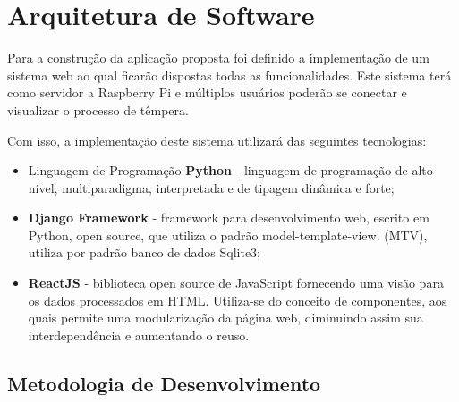 \section{Arquitetura de Software}

Para a construção da aplicação proposta foi definido a implementação de um sistema web ao qual ficarão dispostas todas as funcionalidades. Este sistema terá como servidor a Raspberry Pi e múltiplos usuários poderão se conectar e visualizar o processo de têmpera.

Com isso, a implementação deste sistema utilizará das seguintes tecnologias:
\begin{itemize}
	\item Linguagem de Programação \textbf{Python} - linguagem de programação de alto nível, multiparadigma, interpretada e de tipagem dinâmica e forte;
	\item \textbf{Django Framework} - framework para desenvolvimento web, escrito em Python, open source, que utiliza o padrão model-template-view. (MTV), utiliza por padrão banco de dados Sqlite3;
	\item \textbf{ReactJS} - biblioteca open source de JavaScript fornecendo uma visão para os dados processados em HTML\@. Utiliza-se do conceito de componentes, aos quais permite uma modularização da página web, diminuindo assim sua interdependência e aumentando o reuso.
\end{itemize}

\subsection{Metodologia de Desenvolvimento}


